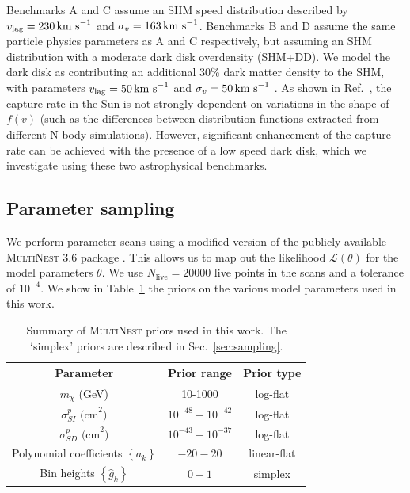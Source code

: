 Benchmarks A and C assume an SHM speed distribution described by $v_\textrm{lag} = 230 \,\textrm{km s}^{-1}$ and $\sigma_v = 163 \,\textrm{km s}^{-1}$. Benchmarks B and D assume the same particle physics parameters as A and C respectively, but assuming an SHM distribution with a moderate dark disk overdensity (SHM+DD). We model the dark disk as contributing an additional 30\% dark matter density to the SHM, with parameters $v_\textrm{lag} = 50 \,\textrm{km s}^{-1}$ and $\sigma_v = 50 \,\textrm{km s}^{-1}$ \cite{}. As shown in Ref.~\cite{Choi:2013}, the capture rate in the Sun is not strongly dependent on variations in the shape of $f(v)$ (such as the differences between distribution functions extracted from different N-body simulations). However, significant enhancement of the capture rate can be achieved with the presence of a low speed dark disk, which we investigate using these two astrophysical benchmarks.


\subsection{Parameter sampling}
\label{sec:NT:sampling}
We perform parameter scans using a modified version of the publicly available \textsc{MultiNest 3.6} package \cite{Feroz:2007, Feroz:2008, Feroz:2014}. This allows us to map out the likelihood $\mathcal{L}(\theta)$ for the model parameters $\theta$.  We use $N_\textrm{live} = 20000$ live points in the scans and a tolerance of $10^{-4}$. We show in Table~\ref{tab:NT:priors} the priors on the various model parameters used in this work.

\begin{table}
  \setlength{\extrarowheight}{3pt}
  \begin{center}
	\begin{tabular}{ccc}
        \hline\hline
	Parameter & Prior range & Prior type \\
        \hline
        $m_\chi$ (GeV) & 10-1000 & log-flat \\
        $\sigma^p_{SI} \textrm{ (cm}^2\textrm{)}$ & $10^{-48} - 10^{-42}$ & log-flat \\
        $\sigma^p_{SD} \textrm{ (cm}^2\textrm{)}$ & $10^{-43} - 10^{-37}$ & log-flat \\
        Polynomial coefficients $\left\{a_k\right\}$ & $-20 - 20$ & linear-flat \\
        Bin heights $\left\{\hat{g}_k\right\}$ & $0-1$ & simplex \\
        \hline\hline
        \end{tabular}
  \end{center}
\label{tab:NT:priors}
\caption[Summary of \textsc{MultiNest} priors used in Chapter~\ref{ch:NT}]{Summary of \textsc{MultiNest} priors used in this work. The `simplex' priors are described in Sec.~\ref{sec:sampling}.}
\end{table}

